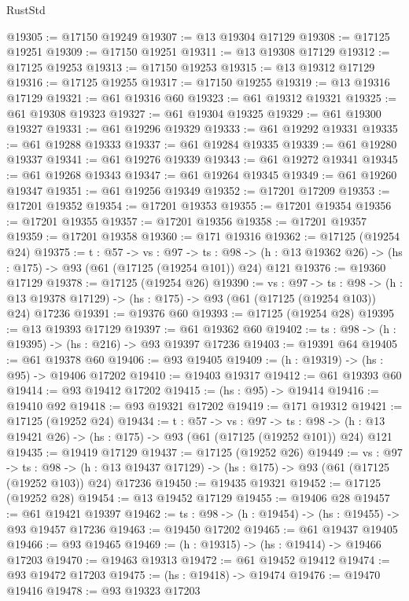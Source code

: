 \begin{lexlean}{RustStd}
\begin{coremodule}
@19305 := @17150 @19249
@19307 := @13 @19304 @17129
@19308 := @17125 @19251
@19309 := @17150 @19251
@19311 := @13 @19308 @17129
@19312 := @17125 @19253
@19313 := @17150 @19253
@19315 := @13 @19312 @17129
@19316 := @17125 @19255
@19317 := @17150 @19255
@19319 := @13 @19316 @17129
@19321 := @61 @19316 @60
@19323 := @61 @19312 @19321
@19325 := @61 @19308 @19323
@19327 := @61 @19304 @19325
@19329 := @61 @19300 @19327
@19331 := @61 @19296 @19329
@19333 := @61 @19292 @19331
@19335 := @61 @19288 @19333
@19337 := @61 @19284 @19335
@19339 := @61 @19280 @19337
@19341 := @61 @19276 @19339
@19343 := @61 @19272 @19341
@19345 := @61 @19268 @19343
@19347 := @61 @19264 @19345
@19349 := @61 @19260 @19347
@19351 := @61 @19256 @19349
@19352 := @17201 @17209
@19353 := @17201 @19352
@19354 := @17201 @19353
@19355 := @17201 @19354
@19356 := @17201 @19355
@19357 := @17201 @19356
@19358 := @17201 @19357
@19359 := @17201 @19358
@19360 := @171 @19316
@19362 := @17125 (@19254 @24)
@19375 := {t : @57} ->
  {vs : @97} ->
  {ts : @98} -> (h : @13 @19362 @26) -> (hs : @175) -> @93 (@61 (@17125 (@19254 @101)) @24) @121
@19376 := @19360 @17129
@19378 := @17125 (@19254 @26)
@19390 := {vs : @97} ->
  {ts : @98} ->
  (h : @13 @19378 @17129) -> (hs : @175) -> @93 (@61 (@17125 (@19254 @103)) @24) @17236
@19391 := @19376 @60
@19393 := @17125 (@19254 @28)
@19395 := @13 @19393 @17129
@19397 := @61 @19362 @60
@19402 := {ts : @98} -> (h : @19395) -> (hs : @216) -> @93 @19397 @17236
@19403 := @19391 @64
@19405 := @61 @19378 @60
@19406 := @93 @19405
@19409 := (h : @19319) -> (hs : @95) -> @19406 @17202
@19410 := @19403 @19317
@19412 := @61 @19393 @60
@19414 := @93 @19412 @17202
@19415 := (hs : @95) -> @19414
@19416 := @19410 @92
@19418 := @93 @19321 @17202
@19419 := @171 @19312
@19421 := @17125 (@19252 @24)
@19434 := {t : @57} ->
  {vs : @97} ->
  {ts : @98} -> (h : @13 @19421 @26) -> (hs : @175) -> @93 (@61 (@17125 (@19252 @101)) @24) @121
@19435 := @19419 @17129
@19437 := @17125 (@19252 @26)
@19449 := {vs : @97} ->
  {ts : @98} ->
  (h : @13 @19437 @17129) -> (hs : @175) -> @93 (@61 (@17125 (@19252 @103)) @24) @17236
@19450 := @19435 @19321
@19452 := @17125 (@19252 @28)
@19454 := @13 @19452 @17129
@19455 := @19406 @28
@19457 := @61 @19421 @19397
@19462 := {ts : @98} -> (h : @19454) -> (hs : @19455) -> @93 @19457 @17236
@19463 := @19450 @17202
@19465 := @61 @19437 @19405
@19466 := @93 @19465
@19469 := (h : @19315) -> (hs : @19414) -> @19466 @17203
@19470 := @19463 @19313
@19472 := @61 @19452 @19412
@19474 := @93 @19472 @17203
@19475 := (hs : @19418) -> @19474
@19476 := @19470 @19416
@19478 := @93 @19323 @17203

\end{coremodule}
\end{lexlean}
